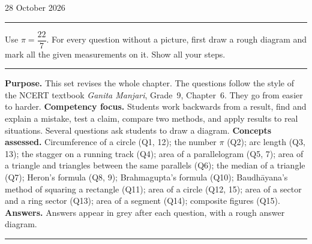 \hfill 28 October 2026\par
\vspace{2pt}
\noindent\rule{\linewidth}{0.6pt}\par
\vspace{2pt}
{\small Use $\pi=\dfrac{22}{7}$. For every question without a picture, first draw a rough diagram and mark all the given measurements on it. Show all your steps.\par}
\ifteacher
\vspace{4pt}
{\color{thinrule}\noindent\rule{\linewidth}{0.4pt}}\par
\vspace{4pt}
{\small\color{muted}\linespread{1.15}\selectfont
\textbf{Purpose.} This set revises the whole chapter. The questions follow the style of the NCERT textbook \textit{Ganita Manjari}, Grade~9, Chapter~6. They go from easier to harder.\nl
\textbf{Competency focus.} Students work backwards from a result, find and explain a mistake, test a claim, compare two methods, and apply results to real situations. Several questions ask students to draw a diagram.\nl
\textbf{Concepts assessed.} Circumference of a circle (Q1, 12); the number $\pi$ (Q2); arc length (Q3, 13); the stagger on a running track (Q4); area of a parallelogram (Q5, 7); area of a triangle and triangles between the same parallels (Q6); the median of a triangle (Q7); Heron's formula (Q8, 9); Brahmagupta's formula (Q10); Baudh\={a}yana's method of squaring a rectangle (Q11); area of a circle (Q12, 15); area of a sector and a ring sector (Q13); area of a segment (Q14); composite figures (Q15).\nl
\textbf{Answers.} Answers appear in grey after each question, with a rough answer diagram.\par}
\vspace{4pt}
{\color{thinrule}\noindent\rule{\linewidth}{0.4pt}}\par
\vspace{3pt}
\fi
